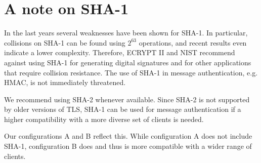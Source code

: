 \section{A note on SHA-1}
\label{section:SHA}


In the last years several weaknesses have been shown for SHA-1. In
particular, collisions on SHA-1 can be found using $2^{63}$ operations, and
recent results even indicate a lower complexity. Therefore,
ECRYPT II and NIST recommend against using SHA-1 for generating digital
signatures and for other applications that require collision resistance.
The use of SHA-1 in message authentication, e.g. HMAC, is not
immediately threatened.

We recommend using SHA-2 whenever available. Since SHA-2 is not
supported by older versions of TLS, SHA-1 can be used for message
authentication if a higher compatibility with a more diverse set of
clients is needed.


Our configurations A and B reflect this. While configuration A does not include
SHA-1, configuration B does and thus is more compatible with a wider range of
clients.
